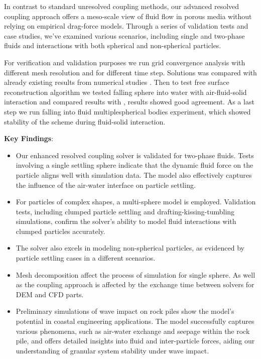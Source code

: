 In contrast to standard unresolved coupling methods, our advanced resolved coupling approach offers a meso-scale view of fluid flow in porous media without relying on empirical drag-force models. Through a series of validation tests and case studies, we've examined various scenarios, including single and two-phase fluids and interactions with both spherical and non-spherical particles.

For verification and validation purposes we run grid convergence analysis with different mesh resolution and for different time step. Solutions was compared with already existing results from numerical studies \cite{nan2023high}. Then to test free surface reconstruction algorithm we tested falling sphere into water with air-fluid-solid interaction and compared results with \cite{pathak20163d}, results showed good agreement. As a last step we run falling into fluid multiplespherical bodies experiment, which showed stability of the scheme during fluid-solid interaction.

\textbf{Key Findings}:
\begin{itemize}
    \item Our enhanced resolved coupling solver is validated for two-phase fluids. Tests involving a single settling sphere indicate that the dynamic fluid force on the particle aligns well with simulation data. The model also effectively captures the influence of the air-water interface on particle settling.
    \item For particles of complex shapes, a multi-sphere model is employed. Validation tests, including clumped particle settling and drafting-kissing-tumbling simulations, confirm the solver's ability to model fluid interactions with clumped particles accurately.
    \item The solver also excels in modeling non-spherical particles, as evidenced by particle settling cases in a different scenarios.
    \item Mesh decomposition affect the process of simulation for single sphere. As well as the coupling approach is affected by the exchange time between solvers for DEM and CFD parts.
    \item Preliminary simulations of wave impact on rock piles show the model's potential in coastal engineering applications. The model successfully captures various phenomena, such as air-water exchange and seepage within the rock pile, and offers detailed insights into fluid and inter-particle forces, aiding our understanding of granular system stability under wave impact.
\end{itemize}

